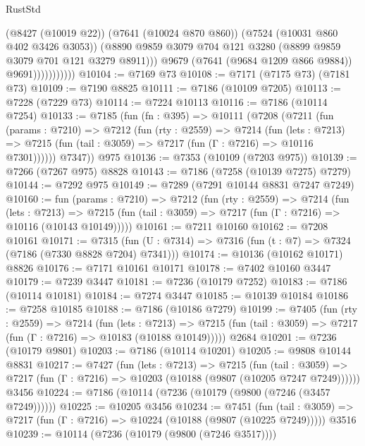 \begin{lexlean}{RustStd}
\begin{coremodule}
                            (@8427 (@10019 @22))
                            (@7641 (@10024 @870 @860))
                            (@7524 (@10031 @860 @402 @3426 @3053))
                            (@8890
                              @9859
                              @3079
                              @704
                              @121
                              @3280
                              (@8899 @9859 @3079 @701 @121 @3279 @8911)))
                          @9679
                          (@7641 (@9684 @1209 @866 @9884))
                          @9691)))))))))))
@10104 := @7169 @73
@10108 := @7171 (@7175 @73) (@7181 @73)
@10109 := @7190 @8825
@10111 := @7186 (@10109 @7205)
@10113 := @7228 (@7229 @73)
@10114 := @7224 @10113
@10116 := @7186 (@10114 @7254)
@10133 := @7185
    (fun (fn : @395) =>
    @10111
      (@7208
        (@7211
          (fun (params : @7210) =>
          @7212
            (fun (rty : @2559) =>
            @7214
              (fun (lets : @7213) =>
              @7215 (fun (tail : @3059) => @7217 (fun (Γ : @7216) => @10116 @7301))))))
        @7347))
    @975
@10136 := @7353 (@10109 (@7203 @975))
@10139 := @7266 (@7267 @975) @8828
@10143 := @7186 (@7258 (@10139 @7275) @7279)
@10144 := @7292 @975
@10149 := @7289 (@7291 @10144 @8831 @7247 @7249)
@10160 := fun (params : @7210) =>
  @7212
    (fun (rty : @2559) =>
    @7214
      (fun (lets : @7213) =>
      @7215 (fun (tail : @3059) => @7217 (fun (Γ : @7216) => @10116 (@10143 @10149)))))
@10161 := @7211 @10160
@10162 := @7208 @10161
@10171 := @7315 (fun (U : @7314) => @7316 (fun (t : @7) => @7324 (@7186 (@7330 @8828 @7204) @7341)))
@10174 := @10136 (@10162 @10171) @8826
@10176 := @7171 @10161 @10171
@10178 := @7402 @10160 @3447
@10179 := @7239 @3447
@10181 := @7236 (@10179 @7252)
@10183 := @7186 (@10114 @10181)
@10184 := @7274 @3447
@10185 := @10139 @10184
@10186 := @7258 @10185
@10188 := @7186 (@10186 @7279)
@10199 := @7405
    (fun (rty : @2559) =>
    @7214
      (fun (lets : @7213) =>
      @7215 (fun (tail : @3059) => @7217 (fun (Γ : @7216) => @10183 (@10188 @10149)))))
    @2684
@10201 := @7236 (@10179 @9801)
@10203 := @7186 (@10114 @10201)
@10205 := @9808 @10144 @8831
@10217 := @7427
    (fun (lets : @7213) =>
    @7215
      (fun (tail : @3059) =>
      @7217 (fun (Γ : @7216) => @10203 (@10188 (@9807 (@10205 @7247 @7249))))))
    @3456
@10224 := @7186 (@10114 (@7236 (@10179 (@9800 (@7246 (@3457 @7249))))))
@10225 := @10205 @3456
@10234 := @7451
    (fun (tail : @3059) => @7217 (fun (Γ : @7216) => @10224 (@10188 (@9807 (@10225 @7249)))))
    @3516
@10239 := @10114 (@7236 (@10179 (@9800 (@7246 @3517))))

\end{coremodule}
\end{lexlean}
